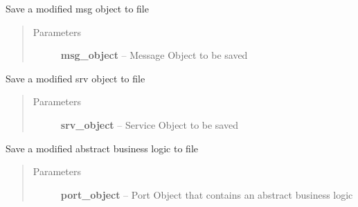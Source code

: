 \documentclass[letterpaper,10pt,english]{sphinxmanual}
\begin{document}
\begin{fulllineitems}
\begin{fulllineitems}
\begin{quote}
\begin{description}
\end{description}\end{quote}

\end{fulllineitems}


\begin{fulllineitems}
\label{class_Project:ROSMOD_Project.save_msg}
Save a modified msg object to file
\begin{quote}\begin{description}
\item[{Parameters}] \leavevmode
\textbf{msg\_object} -- Message Object to be saved

\end{description}\end{quote}

\end{fulllineitems}


\begin{fulllineitems}
\label{class_Project:ROSMOD_Project.save_srv}
Save a modified srv object to file
\begin{quote}\begin{description}
\item[{Parameters}] \leavevmode
\textbf{srv\_object} -- Service Object to be saved

\end{description}\end{quote}

\end{fulllineitems}


\begin{fulllineitems}
\label{class_Project:ROSMOD_Project.save_abl}
Save a modified abstract business logic to file
\begin{quote}\begin{description}
\item[{Parameters}] \leavevmode
\textbf{port\_object} -- Port Object that contains an abstract business logic

\end{description}\end{quote}


\end{fulllineitems}
\end{fulllineitems}
\end{document}

